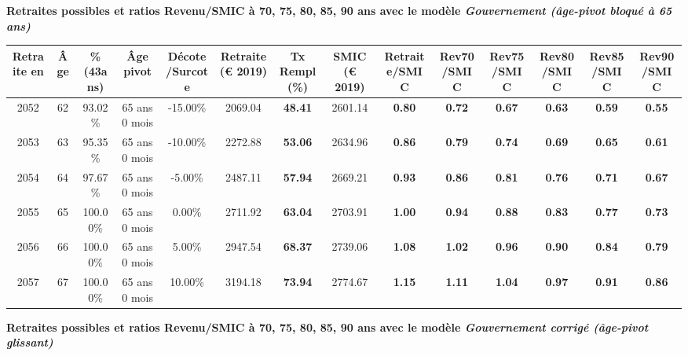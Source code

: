 {\bf \noindent Retraites possibles et ratios Revenu/SMIC à 70, 75, 80, 85, 90 ans avec le modèle \emph{Gouvernement (âge-pivot bloqué à 65 ans)}}  
 
\begin{adjustbox}{max width=\textwidth} 
\begin{tabular}[htb]{|c|c||c|c|c||c|c||c||c|c|c|c|c|c|} 
\hline 
 Retraite en &  Âge &  \%(43ans) &  Âge pivot &  Décote/Surcote &  Retraite (\euro{} 2019) &  Tx Rempl(\%) &  SMIC (\euro{} 2019) &  Retraite/SMIC &  Rev70/SMIC &  Rev75/SMIC &  Rev80/SMIC &  Rev85/SMIC &  Rev90/SMIC \\ 
\hline \hline 
 2052 &  62 &  93.02\% &  65 ans 0 mois &  -15.00\% &  2069.04 &  {\bf 48.41} &  2601.14 &  {\bf {\color{red} 0.80}} &  {\bf {\color{red} 0.72}} &  {\bf {\color{red} 0.67}} &  {\bf {\color{red} 0.63}} &  {\bf {\color{red} 0.59}} &  {\bf {\color{red} 0.55}} \\ 
\hline 
 2053 &  63 &  95.35\% &  65 ans 0 mois &  -10.00\% &  2272.88 &  {\bf 53.06} &  2634.96 &  {\bf {\color{red} 0.86}} &  {\bf {\color{red} 0.79}} &  {\bf {\color{red} 0.74}} &  {\bf {\color{red} 0.69}} &  {\bf {\color{red} 0.65}} &  {\bf {\color{red} 0.61}} \\ 
\hline 
 2054 &  64 &  97.67\% &  65 ans 0 mois &  -5.00\% &  2487.11 &  {\bf 57.94} &  2669.21 &  {\bf {\color{red} 0.93}} &  {\bf {\color{red} 0.86}} &  {\bf {\color{red} 0.81}} &  {\bf {\color{red} 0.76}} &  {\bf {\color{red} 0.71}} &  {\bf {\color{red} 0.67}} \\ 
\hline 
 2055 &  65 &  100.00\% &  65 ans 0 mois &  0.00\% &  2711.92 &  {\bf 63.04} &  2703.91 &  {\bf 1.00} &  {\bf {\color{red} 0.94}} &  {\bf {\color{red} 0.88}} &  {\bf {\color{red} 0.83}} &  {\bf {\color{red} 0.77}} &  {\bf {\color{red} 0.73}} \\ 
\hline 
 2056 &  66 &  100.00\% &  65 ans 0 mois &  5.00\% &  2947.54 &  {\bf 68.37} &  2739.06 &  {\bf 1.08} &  {\bf 1.02} &  {\bf {\color{red} 0.96}} &  {\bf {\color{red} 0.90}} &  {\bf {\color{red} 0.84}} &  {\bf {\color{red} 0.79}} \\ 
\hline 
 2057 &  67 &  100.00\% &  65 ans 0 mois &  10.00\% &  3194.18 &  {\bf 73.94} &  2774.67 &  {\bf 1.15} &  {\bf 1.11} &  {\bf 1.04} &  {\bf {\color{red} 0.97}} &  {\bf {\color{red} 0.91}} &  {\bf {\color{red} 0.86}} \\ 
\hline 
\hline 
\end{tabular} 
\end{adjustbox} 
 
 \vspace{0.1cm} 
{\bf \noindent Retraites possibles et ratios Revenu/SMIC à 70, 75, 80, 85, 90 ans avec le modèle \emph{Gouvernement corrigé (âge-pivot glissant)}}  
 
